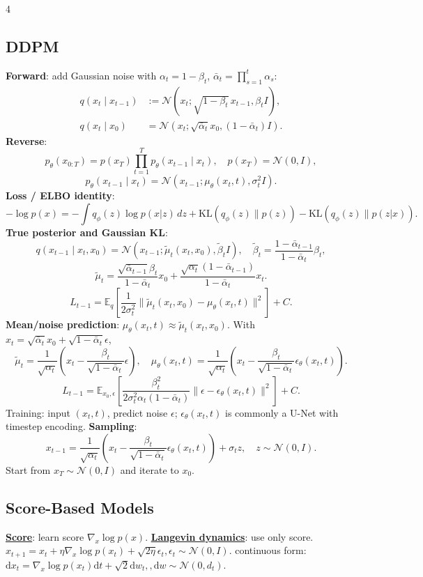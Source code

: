 \documentclass{article}
\newcommand{\key}[1]{\textbf{#1}}
\newcommand{\lowterm}[1]{\textbf{\underline{#1}}}
\newcommand{\E}{\mathbb{E}}
\newcommand{\N}{\mathcal{N}}
\newcommand{\KL}{\mathrm{KL}}
\newcommand{\1}{\mathbf 1}
\newcommand{\dd}{\mathrm{d}}
\begin{document}
\begin{multicols*}{4}
\subsection{DDPM}
\key{Forward}: add Gaussian noise with $\alpha_t=1-\beta_t$, $\bar\alpha_t=\prod_{s=1}^t\alpha_s$:
\[
\begin{aligned}
q(x_t\mid x_{t-1})&:=\N\!\left(x_t;\sqrt{1-\beta_t}\,x_{t-1},\beta_t I\right),\\
q(x_t\mid x_0)&=\N\!\left(x_t;\sqrt{\bar\alpha_t}x_0,(1-\bar\alpha_t)I\right).
\end{aligned}
\]
\key{Reverse}:
\[
p_\theta(x_{0:T})=p(x_T)\prod_{t=1}^T p_\theta(x_{t-1}\mid x_t),\quad
p(x_T)=\N(0,I),
\]
\[
p_\theta(x_{t-1}\mid x_t)=\N(x_{t-1};\mu_\theta(x_t,t),\sigma_t^2I).
\]
\key{Loss / ELBO identity}:
\[
-\log p(x)=-\int q_\phi(z)\log p(x|z)\,dz
+\KL(q_\phi(z)\|p(z))-\KL(q_\phi(z)\|p(z|x)).
\]
\key{True posterior and Gaussian KL}: 
\[
q(x_{t-1}\mid x_t,x_0)=\N(x_{t-1};\tilde\mu_t(x_t,x_0),\tilde\beta_tI),
\quad
\tilde\beta_t=\frac{1-\bar\alpha_{t-1}}{1-\bar\alpha_t}\beta_t,
\]
\[
\tilde\mu_t=
\frac{\sqrt{\bar\alpha_{t-1}}\beta_t}{1-\bar\alpha_t}x_0+
\frac{\sqrt{\alpha_t}(1-\bar\alpha_{t-1})}{1-\bar\alpha_t}x_t.
\]
\[
L_{t-1}=\E_q\left[
\frac{1}{2\sigma_t^2}
\|\tilde\mu_t(x_t,x_0)-\mu_\theta(x_t,t)\|^2
\right]+C.
\]
\key{Mean/noise prediction}: $\mu_\theta(x_t,t)\approx\tilde\mu_t(x_t,x_0)$. With $x_t=\sqrt{\bar\alpha_t}x_0+\sqrt{1-\bar\alpha_t}\epsilon$,
\[
\tilde\mu_t=\frac{1}{\sqrt{\alpha_t}}
\left(x_t-\frac{\beta_t}{\sqrt{1-\bar\alpha_t}}\epsilon\right),\quad
\mu_\theta(x_t,t)=\frac{1}{\sqrt{\alpha_t}}
\left(x_t-\frac{\beta_t}{\sqrt{1-\bar\alpha_t}}\epsilon_\theta(x_t,t)\right).
\]
\[
L_{t-1}=\E_{x_0,\epsilon}\left[
\frac{\beta_t^2}{2\sigma_t^2\alpha_t(1-\bar\alpha_t)}
\|\epsilon-\epsilon_\theta(x_t,t)\|^2
\right]+C.
\]
Training: input $(x_t,t)$, predict noise $\epsilon$; $\epsilon_\theta(x_t,t)$ is commonly a U-Net with timestep encoding. \key{Sampling}:
\[
x_{t-1}
=\frac{1}{\sqrt{\alpha_t}}
\left(x_t-\frac{\beta_t}{\sqrt{1-\bar\alpha_t}}\epsilon_\theta(x_t,t)\right)
+\sigma_tz,\quad z\sim\N(0,I).
\]
Start from $x_T\sim\N(0,I)$ and iterate to $x_0$.

\subsection{Score-Based Models}
\lowterm{Score}: learn score $\nabla_x \log p(x)$. \lowterm{Langevin dynamics}: use only score. $x_{t+1}=x_t+\eta \nabla_x \log p(x_t)+\sqrt{2\eta}\epsilon_t, \epsilon_t\sim \N(0,I)$. continuous form: $\dd x_t=\nabla_x \log p(x_t)\dd t+\sqrt{2}\dd w_t,, \dd w\sim\N(0,d_t)$. 



\end{multicols*}
\end{document}
